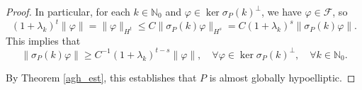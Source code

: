 \documentclass[10pt,a4paper]{amsart}
\begin{document}
\begin{proof}
		In particular, for each $k\in\mathbb{N}_0$ and $\varphi\in\ker\sigma_P(k)^\perp$, we have $\varphi\in\mathcal{F}$, so
		\begin{equation*}
			(1+\lambda_k)^t\|\varphi\|=\|\varphi\|_{H^t}\leq C\|\sigma_P(k)\varphi\|_{H^s}=C(1+\lambda_k)^s\|\sigma_P(k)\varphi\|.
		\end{equation*}
		This implies that
		\begin{equation*}
			\|\sigma_P(k)\varphi\|\geq C^{-1}(1+\lambda_k)^{t-s}\|\varphi\|,\quad \forall \varphi\in\ker\sigma_P(k)^\perp, \quad \forall k\in\mathbb{N}_0.
		\end{equation*}
		
		By Theorem \ref{agh_est}, this establishes that $P$ is almost globally hypoelliptic.
	\end{proof}
\end{document}
